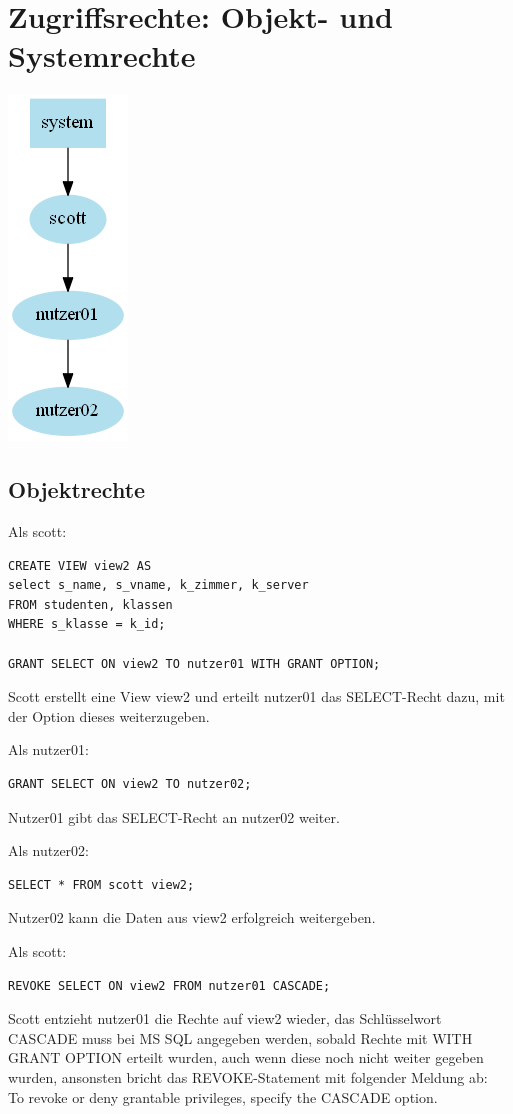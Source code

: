 \documentclass[10pt]{scrreprt}
\begin{document}
\section{Zugriffsrechte: Objekt- und Systemrechte}
\begin{center}
\includegraphics[scale=0.5]{Oracle_Dependency.png}
\end{center}
\subsection{Objektrechte}
Als scott:
\begin{lstlisting}[style=sql]
CREATE VIEW view2 AS
select s_name, s_vname, k_zimmer, k_server
FROM studenten, klassen
WHERE s_klasse = k_id;

GRANT SELECT ON view2 TO nutzer01 WITH GRANT OPTION;
\end{lstlisting}
Scott erstellt eine View view2 und erteilt nutzer01 das SELECT-Recht dazu, mit der Option dieses weiterzugeben.

Als nutzer01:
\begin{lstlisting}[style=sql]
GRANT SELECT ON view2 TO nutzer02;
\end{lstlisting}
Nutzer01 gibt das SELECT-Recht an nutzer02 weiter.

Als nutzer02:
\begin{lstlisting}[style=sql]
SELECT * FROM scott view2;
\end{lstlisting}
Nutzer02 kann die Daten aus view2 erfolgreich weitergeben.

Als scott:
\begin{lstlisting}[style=sql]
REVOKE SELECT ON view2 FROM nutzer01 CASCADE;
\end{lstlisting}
Scott entzieht nutzer01 die Rechte auf view2 wieder, das Schlüsselwort CASCADE muss bei MS SQL angegeben werden, sobald Rechte mit WITH GRANT OPTION erteilt wurden, auch wenn diese noch nicht weiter gegeben wurden, ansonsten bricht das REVOKE-Statement mit folgender Meldung ab:\\
To revoke or deny grantable privileges, specify the CASCADE option.
\end{document}
